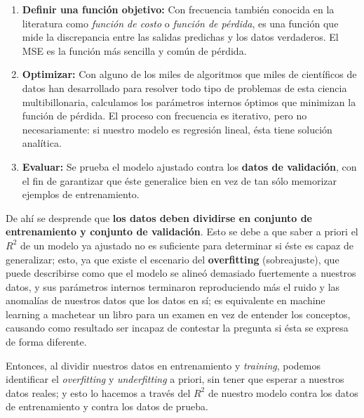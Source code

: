 \documentclass[spanish,oneside]{book} %
\begin{document}
\begin{enumerate}
   \item \textbf{Definir una función objetivo:} Con frecuencia también conocida en la literatura como \textit{función de costo} o \textit{función de pérdida}, es una función que mide la discrepancia entre las salidas predichas y los datos verdaderos. El MSE es la función más sencilla y común de pérdida.
   \item \textbf{Optimizar:} Con alguno de los miles de algoritmos que miles de científicos de datos han desarrollado para resolver todo tipo de problemas de esta ciencia multibillonaria, calculamos los parámetros internos óptimos que minimizan la función de pérdida. El proceso con frecuencia es iterativo, pero no necesariamente: si nuestro modelo es regresión lineal, ésta tiene solución analítica.
   \item \textbf{Evaluar:} Se prueba el modelo ajustado contra los \textbf{datos de validación}, con el fin de garantizar que éste generalice bien en vez de tan sólo memorizar ejemplos de entrenamiento.
\end{enumerate}

De ahí se desprende que \textbf{los datos deben dividirse en conjunto de entrenamiento y conjunto de validación}. Esto se debe a que saber a priori el $R^2$ de un modelo ya ajustado no es suficiente para determinar si éste es capaz de generalizar; esto, ya que existe el escenario del \textbf{overfitting} (sobreajuste), que puede describirse como que el modelo se alineó demasiado fuertemente a nuestros datos, y sus parámetros internos terminaron reproduciendo más el ruido y las anomalías de nuestros datos que los datos en sí; es equivalente en machine learning a machetear un libro para un examen en vez de entender los conceptos, causando como resultado ser incapaz de contestar la pregunta si ésta se expresa de forma diferente.

Entonces, al dividir nuestros datos en entrenamiento y \textit{training}, podemos identificar el \textit{overfitting} y \textit{underfitting} a priori, sin tener que esperar a nuestros datos reales; y esto lo hacemos a través del $R^2$ de nuestro modelo contra los datos de entrenamiento y contra los datos de prueba.
\end{document}
